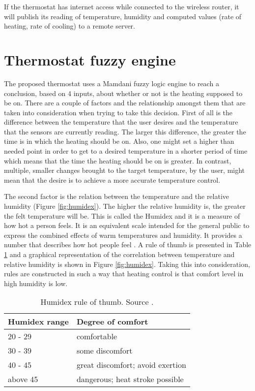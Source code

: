 \documentclass[conference]{IEEEtran}
\let\Oldsection\section
\renewcommand{\section}{\FloatBarrier\Oldsection}
\begin{document}
If the thermostat has internet access while connected to the wireless router, it will publish its reading of
temperature, humidity and computed values (rate of heating, rate of cooling) to a remote server.

\section{Thermostat fuzzy engine}

The proposed thermostat uses a Mamdani fuzzy logic engine to reach a conclusion, based on 4 inputs, about
whether or not is the heating supposed to be on.
There are a couple of factors and the relationship amongst them that are taken into consideration when trying to
take this decision. First of all is the difference between the temperature that the user desires and the temperature
that the sensors are currently reading. The larger this difference, the greater the time is in which the heating
should be on. Also, one might set a higher than needed point in order to get to a desired temperature in a shorter
period of time which means that the time the heating should be on is greater. In contrast, multiple, smaller
changes brought to the target temperature, by the user, might mean that the desire is to achieve a more accurate
temperature control.

The second factor is the relation between the temperature and the relative humidity (Figure \ref{fig:humidex}).
The higher the relative humidity is, the greater the felt temperature will be. This is called the Humidex and
it is a measure of how hot a person feels. It is an equivalent scale intended for the general public to
express the combined effects of warm temperatures and humidity. It provides a number that describes how hot
people feel \cite{website:humidex}. A rule of thumb is presented in Table \ref{table:humidex_thumb} and a
graphical representation of the correlation between temperature and relative humidity is shown in Figure
\ref{fig:humidex}. Taking this into consideration, rules are constructed in such a way that heating control is
 that comfort level in high humidity is low.

\begin{center}
    \begin{table}[h!]
    \centering
    \begin{tabular}{| l | l |}
        \hline
        Humidex range & Degree of comfort  \\ \hline
        20 - 29 & comfortable \\ \hline
        30 - 39 & some discomfort \\ \hline
        40 - 45 & great discomfort; avoid exertion \\ \hline
        above 45 & dangerous; heat stroke possible \\ \hline
    \end{tabular}
    \caption[Humidex rule of thumb]{Humidex rule of thumb. Source \cite{website:humidex}.}
    \label{table:humidex_thumb}
    \end{table}
\end{center}
\end{document}
